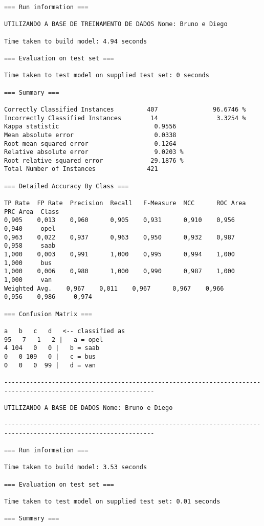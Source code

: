 \documentclass[
	article,			%
	11pt,				%
	oneside,			%
	a4paper,			%
	english,			%
	brazil,				%
	sumario=tradicional
	]{abntex2}
\begin{document}
\begin{lstlisting}
=== Run information ===

UTILIZANDO A BASE DE TREINAMENTO DE DADOS Nome: Bruno e Diego

Time taken to build model: 4.94 seconds

=== Evaluation on test set ===

Time taken to test model on supplied test set: 0 seconds

=== Summary ===

Correctly Classified Instances         407               96.6746 %
Incorrectly Classified Instances        14                3.3254 %
Kappa statistic                          0.9556
Mean absolute error                      0.0338
Root mean squared error                  0.1264
Relative absolute error                  9.0203 %
Root relative squared error             29.1876 %
Total Number of Instances              421     

=== Detailed Accuracy By Class ===

TP Rate  FP Rate  Precision  Recall   F-Measure  MCC      ROC Area  PRC Area  Class
0,905    0,013    0,960      0,905    0,931      0,910    0,956     0,940     opel
0,963    0,022    0,937      0,963    0,950      0,932    0,987     0,958     saab
1,000    0,003    0,991      1,000    0,995      0,994    1,000     1,000     bus
1,000    0,006    0,980      1,000    0,990      0,987    1,000     1,000     van
Weighted Avg.    0,967    0,011    0,967      0,967    0,966      0,956    0,986     0,974     

=== Confusion Matrix ===

a   b   c   d   <-- classified as
95   7   1   2 |   a = opel
4 104   0   0 |   b = saab
0   0 109   0 |   c = bus
0   0   0  99 |   d = van

---------------------------------------------------------------------------------------------------------------

UTILIZANDO A BASE DE DADOS Nome: Bruno e Diego

---------------------------------------------------------------------------------------------------------------

=== Run information ===

Time taken to build model: 3.53 seconds

=== Evaluation on test set ===

Time taken to test model on supplied test set: 0.01 seconds

=== Summary ===


\end{lstlisting}
\end{document}
